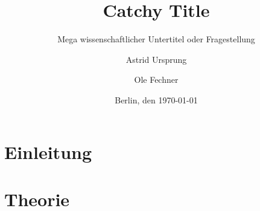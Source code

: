 \documentclass[12pt, titlepage=true, toc=bib]{scrartcl}
\begin{document}
\titlehead{Freie Universität Berlin\\
			FB Politik- und Sozialwissenschaften\\
			Otto-Suhr-Institut\\
			Sommersemester 2016\\
			{[}GEND{]} Rechtsextremismus und Gender: Geschichte und Gegenwart (15095)\\
			Carmen Altmeyer, Till Herold}
\author{Astrid Ursprung\and Ole Fechner}
\title{Catchy Title}
\subtitle{Mega wissenschaftlicher Untertitel oder Fragestellung}
\date{\normalsize{Berlin, den \today}}

\publishers{\normalsize{Goltzstr. 16\hfill Gerichtstr. 13\\
							 10781 Berlin\hfill 13347 Berlin\\
							 ursprung@posteo.de\hfill ole.fechner@fu-berlin.de\\
							 Matrikelnummer: 4768210\hfill Matrikelnummer: 4757766\\
							 BA Politikwissenschaft\hfill BA Politikwissenschaft}}


\maketitle[0]

\newpage
\thispagestyle{empty}
\tableofcontents

\newpage
\setcounter{page}{1}

\section{Einleitung}



\section{Theorie}
\end{document}
